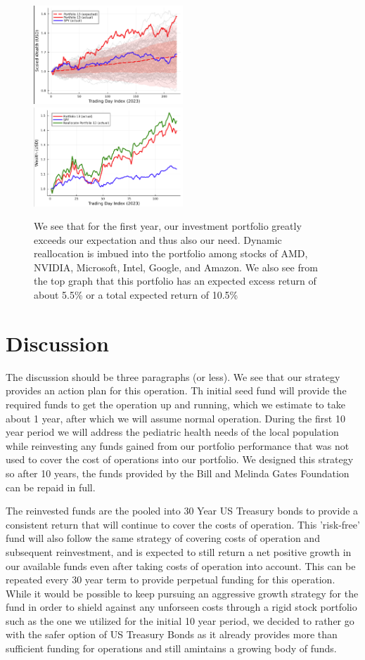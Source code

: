 \documentclass[10pt,twocolumn,twoside,final]{IEEEtran}
\begin{document}
\begin{figure}[!h]\centering
\includegraphics[width=0.5\textwidth]{./figs/year1expected.png}
\includegraphics[width=0.5\textwidth]{./figs/year1reallocated.png}
\caption{We see that for the first year, our investment portfolio greatly exceeds our expectation and thus also our need. Dynamic reallocation is imbued into the portfolio among stocks of AMD, NVIDIA, Microsoft, Intel, Google, and Amazon. We also see from the top graph that this portfolio has an expected excess return of about 5.5\% or a total expected return of 10.5\%}
\end{figure}

\section{Discussion}
The discussion should be three paragraphs (or less). 
We see that our strategy provides an action plan for this operation. Th initial seed fund will provide the required funds to get the operation up and running, which we estimate to take about 1 year, after which we will assume normal operation. During the first 10 year period we will address the pediatric health needs of the local population while reinvesting any funds gained from our portfolio performance that was not used to cover the cost of operations into our portfolio. We designed this strategy so after 10 years, the funds provided by the Bill and Melinda Gates Foundation can be repaid in full. 

The reinvested funds are the pooled into 30 Year US Treasury bonds to provide a consistent return that will continue to cover the costs of operation. This 'risk-free' fund will also follow the same strategy of covering costs of operation and subsequent reinvestment, and is expected to still return a net positive growth in our available funds even after taking costs of operation into account. This can be repeated every 30 year term to provide perpetual funding for this operation. While it would be possible to keep pursuing an aggressive growth strategy for the fund in order to shield against any unforseen costs through a rigid stock portfolio such as the one we utilized for the initial 10 year period, we decided to rather go with the safer option of US Treasury Bonds as it already provides more than sufficient funding for operations and still amintains a growing body of funds.
\end{document}
